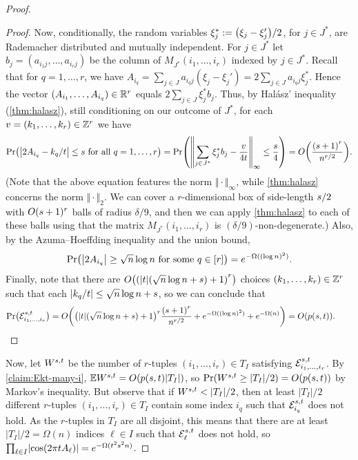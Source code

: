 \documentclass{daj}
\theoremstyle{plain}
\theoremstyle{plain}
\theoremstyle{plain}
\theoremstyle{plain}
\theoremstyle{definition}
\theoremstyle{plain}
\theoremstyle{plain}
\theoremstyle{definition}
\theoremstyle{definition}
\theoremstyle{plain}
\let\originalleft\left
\let\originalright\right
\renewcommand{\left}{\mathopen{}\mathclose\bgroup\originalleft}
\renewcommand{\right}{\aftergroup\egroup\originalright}
\begin{document}
\begin{proof}
\begin{proof}
Now, conditionally, the random variables $\xi_j^*:=\left(\xi_{j}-\xi_{j}'\right)/2$, for $j\in J^*$, are Rademacher distributed and mutually independent. For $j\in J^*$ let $b_j=(a_{i_1j},\dots,a_{i_rj})$ be the column of $M_{J^*}(i_1,\dots,i_r)$ indexed by $j\in J^*$. Recall that for $q=1,\dots,r$, we have $A_{i_q}=\sum_{j\in J}a_{i_qj}(\xi_j-\xi_j')=2\sum_{j\in J}a_{i_qj}\xi_j^*$. Hence the vector $(A_{i_1},\dots,A_{i_q})\in \mathbb{R}^r$ equals $2\sum_{j\in J}\xi_j^*b_j$. Thus, by Hal\'asz' inequality (\cref{thm:halasz}), still conditioning on our outcome of $J^*$, for each $v=(k_{1},\dots,k_{r})\in\mathbb{Z}^{r}$ we have 
\[
\Pr\left(\left|2A_{i_{q}}-\zint_{q}/t\right|\le \posreal \text{ for all }q=1,\dots,r\right)=\Pr\left(\left\Vert\sum_{j\in J^*} \xi_j^* b_j-\frac{v}{4t}\right\Vert_\infty\le \frac \posreal 4\right)=O\left(\frac{\left(\posreal +1\right)^{r}}{n^{r/2}}\right).
\]
(Note that the above equation features the norm $\Vert\cdot\Vert_\infty$, while \cref{thm:halasz} concerns the norm $\Vert\cdot\Vert_2$. We can cover a $r$-dimensional box of side-length $s /2$ with $O(s +1)^r$ balls of radius $\delta/9$, and then we can apply \cref{thm:halasz} to each of these balls using that the matrix $M_{J^*}(i_1,\dots,i_r)$ is $(\delta/9)$-non-degenerate.) Also, by the Azuma--Hoeffding inequality and the union bound,
\[
\Pr\left(\left|2A_{i_{q}}\right|\ge \sqrt{n}\log n\text{ for some }q\in [r]\right)=e^{-\Omega((\log n)^2)}.
\]
Finally, note that there are $O\left(\left(\left|t\right|(\sqrt{n}\log n+\posreal )+1\right)^r\right)$ choices $(k_{1},\dots,k_{r})\in \mathbb{Z}^r$ such that each $|k_q/t|\le \sqrt{n}\log n+s $, so we can conclude that
\[
\Pr\left(\mathcal{E}_{i_{1},\dots,i_{r}}^{\posreal ,t}\right)=O\left(\left(\left|t\right|(\sqrt{n}\log n+\posreal )+1\right)^r\frac{\left(\posreal +1\right)^{r}}{n^{r/2}}+e^{-\Omega((\log n)^2)}+e^{-\Omega(n)}\right)=O\left(p\left(\posreal ,t\right)\right).\tag*{\qedhere}
\]
\end{proof}
Now, let $W^{s ,t}$ be the number of $r$-tuples $(i_{1},\dots,i_{r})\in T_{I}$
satisfying $\mathcal{E}_{i_{1},\dots,i_{r}}^{s ,t}$. By \cref{claim:Ekt-many-i}, $\E W^{\posreal ,t}=O\left(p(\posreal ,t)|T_I|\right)$,
so $\Pr\left(W^{\posreal ,t}\ge |T_I|/2\right)=O\left(p\left(\posreal ,t\right)\right)$
by Markov's inequality. But observe that if $W^{\posreal ,t}<|T_I|/2$, then at least $|T_I|/2$ different $r$-tuples $(i_{1},\dots,i_{r})\in T_{I}$ contain some index $i_q$ such that $\mathcal{E}_{i_{q}}^{s ,t}$ does not hold. As the $r$-tuples in $T_I$ are all disjoint, this means that there are at least $|T_I|/2=\Omega(n)$ indices $\ell\in I$ such that $\mathcal{E}_{\ell}^{s ,t}$ does not hold, so $\prod_{\ell\in I}\left|\cos\left(2\pi tA_{\ell}\right)\right|=e^{-\Omega(t^{2}\posreal^{2}n)}$.


\end{proof}
\end{document}

